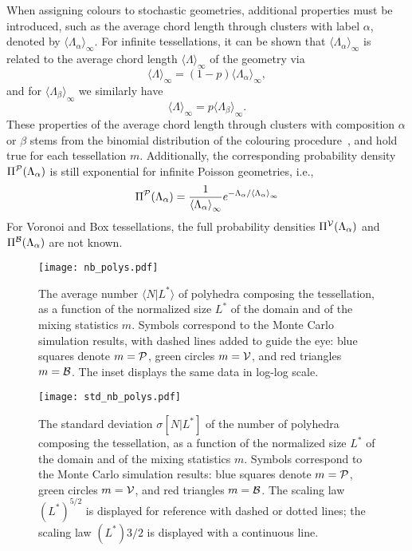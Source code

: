 \documentclass[final,authoryear,5p,times,twocolumn]{elsarticle}
\begin{document}
When assigning colours to stochastic geometries, additional properties must be introduced, such as the average chord length through clusters with label $\alpha$, denoted by ${\langle \Lambda_\alpha \rangle}_{\infty}$. For infinite tessellations, it can be shown that ${\langle \Lambda_\alpha \rangle}_{\infty}$ is related to the average chord length ${\langle \Lambda \rangle}_{\infty}$ of the geometry via
\begin{equation}
{\langle \Lambda \rangle}_{\infty} = (1-p) {\langle \Lambda_\alpha \rangle}_{\infty},
\label{alpha}
\end{equation}
and for ${\langle \Lambda_\beta \rangle}_{\infty}$ we similarly have
\begin{equation}
{\langle \Lambda \rangle}_{\infty} =  p {\langle \Lambda_\beta \rangle}_{\infty}.
\label{beta}
\end{equation}
These properties of the average chord length through clusters with composition $\alpha$ or $\beta$ stems from the binomial distribution of the colouring procedure~\cite{haran, larmier}, and hold true for each tessellation $m$. Additionally, the corresponding probability density $\Pi^{\cal P}(\Lambda_{\alpha})$ is still exponential for infinite Poisson geometries, i.e.,
\begin{equation}
\Pi^{\cal P}(\Lambda_{\alpha})=\frac{1}{{\langle \Lambda_\alpha \rangle}_{\infty}}e^{- \Lambda_{\alpha} / {\langle \Lambda_\alpha \rangle}_{\infty}}
\label{markovian_density_alpha}
\end{equation}
For Voronoi and Box tessellations, the full probability densities $\Pi^{\cal V}(\Lambda_{\alpha})$ and $\Pi^{\cal B}(\Lambda_{\alpha})$ are not known.

\begin{figure}[t]
\begin{center}
\texttt{[image: nb\_polys.pdf]}
\end{center}
\caption{The average number $\langle N | L^*\rangle$ of polyhedra composing the tessellation, as a function of the normalized size $L^*$ of the domain and of the mixing statistics $m$. Symbols correspond to the Monte Carlo simulation results, with dashed lines added to guide the eye: blue squares denote $m={\cal P}$, green circles $m={\cal V}$, and red triangles $m={\cal B}$. The inset displays the same data in log-log scale.}
\label{nbp_size}
\end{figure}

\begin{figure}[t]
\begin{center}
\texttt{[image: std\_nb\_polys.pdf]}
\end{center}
\caption{The standard deviation $\sigma[N|L^*]$ of the number of polyhedra  composing the tessellation, as a function of the normalized size $L^*$ of the domain and of the mixing statistics $m$. Symbols correspond to the Monte Carlo simulation results: blue squares denote $m={\cal P}$, green circles $m={\cal V}$, and red triangles $m={\cal B}$. The scaling law $(L^*)^{5/2}$ is displayed for reference with dashed or dotted lines; the scaling law $(L^*){3/2}$ is displayed with a continuous line.}
\label{std_nbp_size}
\end{figure}
\end{document}

